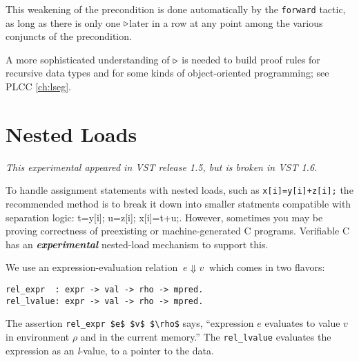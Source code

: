 \documentclass[12pt,fleqn,openany,oneside,showtrims]{memoir}
\newcommand{\ychapter}[2]{\chapter[#1]{#1}}
\begin{document}
This weakening of the precondition is done automatically by the
\lstinline{forward} tactic, as long as there is only one
$\triangleright$later in a row at any point among the various conjuncts of
the precondition.

A more sophisticated understanding of $\triangleright$ is needed to
build proof rules for recursive data types and for
some kinds of object-oriented programming; see PLCC \autoref{ch:lseg}.

\iffalse



\ychapter{Nested Loads}{}

\emph{This experimental appeared in VST release 1.5, but is broken in VST 1.6.}

To handle assignment statements with nested loads, such as
\lstinline{x[i]=y[i]+z[i];}
the recommended method is to break it down into smaller statments
compatible with separation logic: {t=y[i]; u=z[i]; x[i]=t+u;}.
However, sometimes you may be proving correctness of preexisting
or machine-generated C programs.  Verifiable C
has an \textbf{\textit{experimental}} nested-load mechanism to
support this.

We use an expression-evaluation relation $~e\Downarrow v~$
which comes in two flavors:
\begin{lstlisting}
rel_expr  : expr -> val -> rho -> mpred.
rel_lvalue: expr -> val -> rho -> mpred.
\end{lstlisting}
The assertion \lstinline{rel_expr $e$ $v$ $\rho$} says,
``expression $e$ evaluates to value $v$ in environment $\rho$
and in the current memory.''  The \lstinline{rel_lvalue} evaluates
the expression as an \emph{l}-value, to a pointer to the data.
\end{document}

